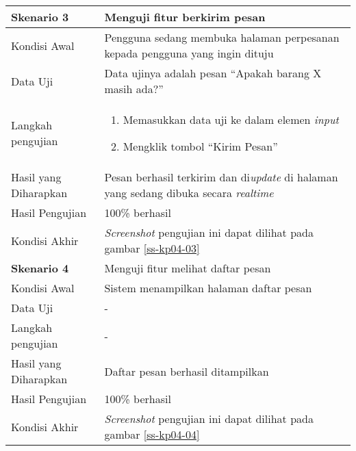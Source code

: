\begin{longtable}{|X|X|}
		
	\textbf{Skenario 3}
		& Menguji fitur berkirim pesan \\ \hline
	Kondisi Awal
		& Pengguna sedang membuka halaman perpesanan kepada pengguna yang ingin dituju\\ \hline
	Data Uji
		& Data ujinya adalah pesan ``Apakah barang X masih ada?'' \\ \hline
	Langkah pengujian
		& \begin{enumerate}
		\item Memasukkan data uji ke dalam elemen \textit{input} 
		\item Mengklik tombol ``Kirim Pesan''
	\end{enumerate} \\ \hline
	Hasil yang Diharapkan
		& Pesan berhasil terkirim dan di\textit{update} di halaman yang sedang dibuka secara \textit{realtime} \\ \hline
	Hasil Pengujian
		& 100\% berhasil \\ \hline	
	Kondisi Akhir
		& \textit{Screenshot} pengujian ini dapat dilihat pada gambar \ref{ss-kp04-03}  \\ \hline	
		
	\textbf{Skenario 4}
		& Menguji fitur melihat daftar pesan \\ \hline
	Kondisi Awal
		& Sistem menampilkan halaman daftar pesan\\ \hline
	Data Uji
		& -\\ \hline
	Langkah pengujian
		& - \\ \hline
	Hasil yang Diharapkan
		& Daftar pesan berhasil ditampilkan \\ \hline
	Hasil Pengujian
		& 100\% berhasil \\ \hline	
	Kondisi Akhir
		& \textit{Screenshot} pengujian ini dapat dilihat pada gambar \ref{ss-kp04-04}  \\ \hline	
		
\end{longtable}